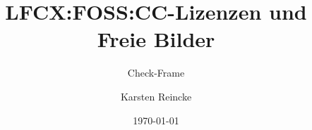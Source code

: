 \documentclass[]{beamer}
\title{LFCX:FOSS:CC-Lizenzen und Freie Bilder}
\subtitle{Check-Frame}
\institute{GS-LDK}
\author{Karsten Reincke}
\date{\today}
\def\cfgGl{../../../../cfg.gl/}
\begin{document}

\begin{frame}
  \titlepage
\end{frame}






\logo{}
\newpage



%
\end{document}
